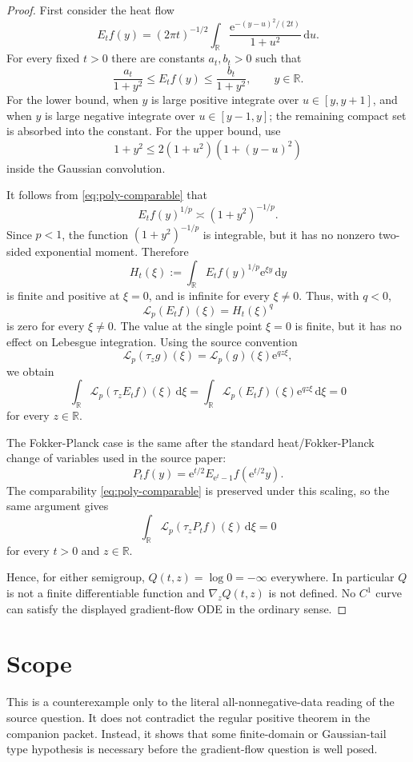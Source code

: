\documentclass[11pt]{article}
\newcommand{\R}{\mathbb R}
\newcommand{\lap}{\mathcal L_p}
\newcommand{\e}{\mathrm e}
\newcommand{\dd}{\,\mathrm d}
\begin{document}
\begin{proof}
First consider the heat flow
\[
  E_tf(y)=(2\pi t)^{-1/2}\int_\R \frac{\e^{-(y-u)^2/(2t)}}{1+u^2}\dd u .
\]
For every fixed $t>0$ there are constants $a_t,b_t>0$ such that
\begin{equation}
\label{eq:poly-comparable}
  \frac{a_t}{1+y^2}\le E_tf(y)\le \frac{b_t}{1+y^2},
  \qquad y\in\R .
\end{equation}
For the lower bound, when $y$ is large positive integrate over
$u\in[y,y+1]$, and when $y$ is large negative integrate over
$u\in[y-1,y]$; the remaining compact set is absorbed into the constant.
For the upper bound, use
\[
  1+y^2\le 2(1+u^2)(1+(y-u)^2)
\]
inside the Gaussian convolution.

It follows from \eqref{eq:poly-comparable} that
\[
  E_tf(y)^{1/p}\asymp (1+y^2)^{-1/p}.
\]
Since $p<1$, the function $(1+y^2)^{-1/p}$ is integrable, but it has no
nonzero two-sided exponential moment. Therefore
\[
  H_t(\xi):=\int_\R E_tf(y)^{1/p}\e^{\xi y}\dd y
\]
is finite and positive at $\xi=0$, and is infinite for every $\xi\ne0$.
Thus, with $q<0$,
\[
  \lap(E_tf)(\xi)=H_t(\xi)^q
\]
is zero for every $\xi\ne0$. The value at the single point $\xi=0$ is finite,
but it has no effect on Lebesgue integration. Using the source convention
\[
  \lap(\tau_z g)(\xi)=\lap(g)(\xi)\e^{qz\xi},
\]
we obtain
\[
  \int_\R \lap(\tau_z E_tf)(\xi)\dd\xi
  =\int_\R \lap(E_tf)(\xi)\e^{qz\xi}\dd\xi=0
\]
for every $z\in\R$.

The Fokker-Planck case is the same after the standard heat/Fokker-Planck
change of variables used in the source paper:
\[
  P_tf(y)=\e^{t/2}E_{\e^t-1}f(\e^{t/2}y).
\]
The comparability \eqref{eq:poly-comparable} is preserved under this scaling,
so the same argument gives
\[
  \int_\R \lap(\tau_z P_tf)(\xi)\dd\xi=0
\]
for every $t>0$ and $z\in\R$.

Hence, for either semigroup, $Q(t,z)=\log0=-\infty$ everywhere. In particular
$Q$ is not a finite differentiable function and $\nabla_zQ(t,z)$ is not
defined. No $C^1$ curve can satisfy the displayed gradient-flow ODE in the
ordinary sense.
\end{proof}

\section*{Scope}

This is a counterexample only to the literal all-nonnegative-data reading of
the source question. It does not contradict the regular positive theorem in
the companion packet. Instead, it shows that some finite-domain or
Gaussian-tail type hypothesis is necessary before the gradient-flow question is
well posed.
\end{document}
